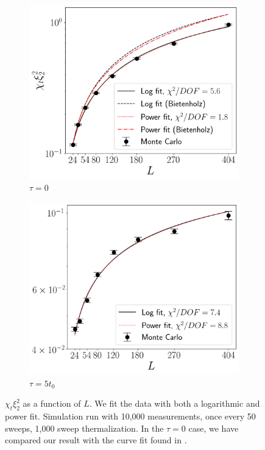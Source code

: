 \documentclass[a4paper,11pt]{article}
\begin{document}
\begin{figure}[h!]
    \begin{center}
      \begin{subfigure}[b]{0.45\textwidth}
          \centering
          \includegraphics[height=0.8\textwidth]{divergence.png}
          \caption{$\tau = 0$}
      \end{subfigure} %
      \begin{subfigure}[b]{0.45\textwidth}
          \centering
          \includegraphics[height=0.8\textwidth]{divergence_flowed.png}
          \caption{$\tau = 5t_0$}
      \end{subfigure}
      \caption{\label{fig:divergence} $\chi_t\xi_2^2$ as a function of $L$. We fit the data with both a logarithmic and power fit. Simulation run with 10,000 measurements, once every 50 sweeps, 1,000 sweep thermalization. In the $\tau=0$ case, we have compared our result with the curve fit found in \cite{bietenholz2018}.}
    \end{center}
\end{figure}
\end{document}
